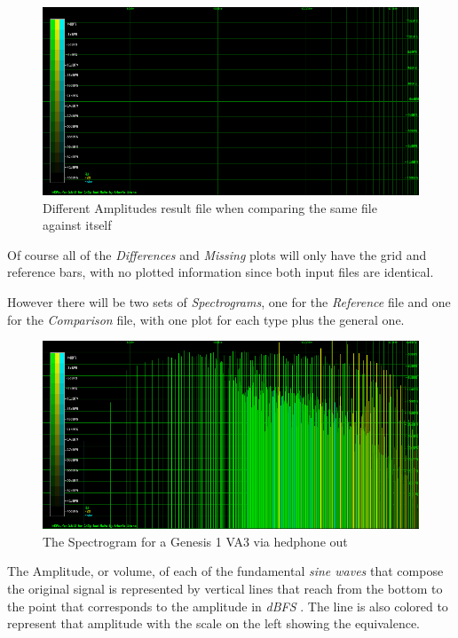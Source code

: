 \documentclass[10pt,a4paper]{report}
\begin{document}
\begin{figure}[H]
	\centering
	\includegraphics[width=1.0\linewidth]{images/interpretation/Plot1-SameFile.png}
	\caption[Same file compared]{Different Amplitudes result file when comparing the same file against itself}
	\label{fig:plot1-samefile}
\end{figure}

Of course all of the \textit{Differences} and \textit{Missing} plots will only have the grid and reference bars, with no plotted information since both input files are identical. 

However there will be two sets of \textit{Spectrograms}, one for the \textit{Reference} file and one for the \textit{Comparison} file, with one plot for each type plus the general one.

\begin{figure}[H]
	\centering
	\includegraphics[width=1.0\linewidth]{images/interpretation/Plot2-SameFile-FM-Spectrogram.png}
	\caption[Spectrogram]{The Spectrogram for a Genesis 1 VA3 via hedphone out}
	\label{fig:plot2-samefile-fm-spectrogram}
\end{figure}

The Amplitude, or volume, of each of the fundamental \textit{sine waves} that compose the original signal is represented by vertical lines that reach from the bottom to the point that corresponds to the amplitude in \textit{dBFS} \cite{dbfs}. The line is also colored to represent that amplitude with the scale on the left showing the equivalence.
\end{document}
